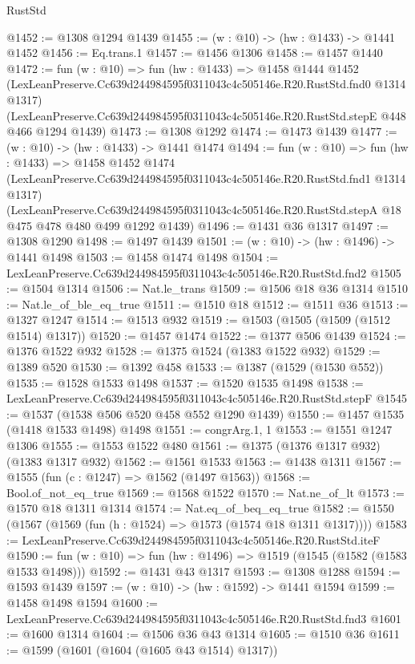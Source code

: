 \begin{lexlean}{RustStd}
\begin{coremodule}
@1452 := @1308 @1294 @1439
@1455 := (w : @10) -> (hw : @1433) -> @1441 @1452
@1456 := Eq.trans.{1}
@1457 := @1456 @1306
@1458 := @1457 @1440
@1472 := fun (w : @10) =>
  fun (hw : @1433) =>
  @1458
    @1444
    @1452
    (LexLeanPreserve.Cc639d244984595f0311043c4c505146e.R20.RustStd.fnd0 @1314 @1317)
    (LexLeanPreserve.Cc639d244984595f0311043c4c505146e.R20.RustStd.stepE @448 @466 @1294 @1439)
@1473 := @1308 @1292
@1474 := @1473 @1439
@1477 := (w : @10) -> (hw : @1433) -> @1441 @1474
@1494 := fun (w : @10) =>
  fun (hw : @1433) =>
  @1458
    @1452
    @1474
    (LexLeanPreserve.Cc639d244984595f0311043c4c505146e.R20.RustStd.fnd1 @1314 @1317)
    (LexLeanPreserve.Cc639d244984595f0311043c4c505146e.R20.RustStd.stepA
      @18
      @475
      @478
      @480
      @499
      @1292
      @1439)
@1496 := @1431 @36 @1317
@1497 := @1308 @1290
@1498 := @1497 @1439
@1501 := (w : @10) -> (hw : @1496) -> @1441 @1498
@1503 := @1458 @1474 @1498
@1504 := LexLeanPreserve.Cc639d244984595f0311043c4c505146e.R20.RustStd.fnd2
@1505 := @1504 @1314
@1506 := Nat.le_trans
@1509 := @1506 @18 @36 @1314
@1510 := Nat.le_of_ble_eq_true
@1511 := @1510 @18
@1512 := @1511 @36
@1513 := @1327 @1247
@1514 := @1513 @932
@1519 := @1503 (@1505 (@1509 (@1512 @1514) @1317))
@1520 := @1457 @1474
@1522 := @1377 @506 @1439
@1524 := @1376 @1522 @932
@1528 := @1375 @1524 (@1383 @1522 @932)
@1529 := @1389 @520
@1530 := @1392 @458
@1533 := @1387 (@1529 (@1530 @552))
@1535 := @1528 @1533 @1498
@1537 := @1520 @1535 @1498
@1538 := LexLeanPreserve.Cc639d244984595f0311043c4c505146e.R20.RustStd.stepF
@1545 := @1537 (@1538 @506 @520 @458 @552 @1290 @1439)
@1550 := @1457 @1535 (@1418 @1533 @1498) @1498
@1551 := congrArg.{1, 1}
@1553 := @1551 @1247 @1306
@1555 := @1553 @1522 @480
@1561 := @1375 (@1376 @1317 @932) (@1383 @1317 @932)
@1562 := @1561 @1533
@1563 := @1438 @1311
@1567 := @1555 (fun (c : @1247) => @1562 (@1497 @1563))
@1568 := Bool.of_not_eq_true
@1569 := @1568 @1522
@1570 := Nat.ne_of_lt
@1573 := @1570 @18 @1311 @1314
@1574 := Nat.eq_of_beq_eq_true
@1582 := @1550 (@1567 (@1569 (fun (h : @1524) => @1573 (@1574 @18 @1311 @1317))))
@1583 := LexLeanPreserve.Cc639d244984595f0311043c4c505146e.R20.RustStd.iteF
@1590 := fun (w : @10) => fun (hw : @1496) => @1519 (@1545 (@1582 (@1583 @1533 @1498)))
@1592 := @1431 @43 @1317
@1593 := @1308 @1288
@1594 := @1593 @1439
@1597 := (w : @10) -> (hw : @1592) -> @1441 @1594
@1599 := @1458 @1498 @1594
@1600 := LexLeanPreserve.Cc639d244984595f0311043c4c505146e.R20.RustStd.fnd3
@1601 := @1600 @1314
@1604 := @1506 @36 @43 @1314
@1605 := @1510 @36
@1611 := @1599 (@1601 (@1604 (@1605 @43 @1514) @1317))

\end{coremodule}
\end{lexlean}
